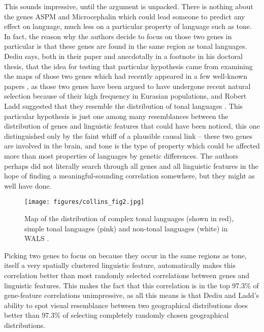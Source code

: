\documentclass[output=paper]{langsci/langscibook}
\begin{document}
This sounds impressive, until the argument is unpacked.  There is nothing about the genes ASPM and Microcephalin which could lead someone to predict any effect on language, much less on a particular property of language such as tone.  In fact, the reason why the authors decide to focus on those two genes in particular is that these genes are found in the same region as tonal languages.  Dediu says, both in their paper and anecdotally in a footnote in his doctoral thesis, that the idea for testing that particular hypothesis came from examining the maps of those two genes which had recently appeared in a few well-known papers \citep{EvansEtAl2005microcephalin,Mekel-Bobrov2005}, as those two genes have been argued to have undergone recent natural selection because of their high frequency in Eurasian populations, and Robert Ladd suggested that they resemble the distribution of tonal languages \citep[192]{Dediu2007}.  This particular hypothesis is just one among many resemblances between the distribution of genes and linguistic features that could have been noticed, this one distinguished only by the faint whiff of a plausible causal link – these two genes are involved in the brain, and tone is the type of property which could be affected more than most properties of languages by genetic differences.  The authors perhaps did not literally search through all genes and all linguistic features in the hope of finding a meaningful-sounding correlation somewhere, but they might as well have done.

\begin{figure}
\texttt{[image: figures/collins\_fig2.jpg]}
\caption{Map of the distribution of complex tonal languages (shown in red), simple tonal languages (pink) and non-tonal languages (white) in WALS \citep{Maddieson2013}.}
\label{fig:collins:1}
\end{figure}




\largerpage
Picking two genes to focus on because they occur in the same regions as tone, itself a very spatially clustered linguistic feature, automatically makes this correlation better than most randomly selected correlations between genes and linguistic features.  This makes the fact that this correlation is in the top 97.3\% of gene-feature correlations unimpressive, as all this means is that Dediu and Ladd’s ability to spot visual resemblance between two geographical distributions does better than 97.3\% of selecting completely randomly chosen geographical distributions.  
\end{document}
